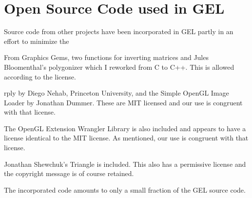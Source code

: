 \documentclass[a4paper]{article}
\begin{document}
\section{Open Source Code used in GEL}  
%
%
Source code from other projects have been incorporated in GEL partly in an effort to minimize the 
\begin{trivlist}
\item From Graphics Gems, two functions for inverting matrices and Jules Bloomenthal's polygonizer which I reworked from C to C++. This is allowed according to the license.
\item rply by Diego Nehab, Princeton University, and the Simple OpenGL Image Loader by Jonathan Dummer.  These are MIT licensed and our use is congruent with that license.
\item The OpenGL Extension Wrangler Library is also included and appears to have a license identical to the MIT license.	 As mentioned, our use is congruent with that license.
\item Jonathan Shewchuk's Triangle is included. This also has a permissive license and the copyright message is of course retained.
\end{trivlist}
The incorporated code amounts to only a small fraction of the GEL source code.
\end{document}
